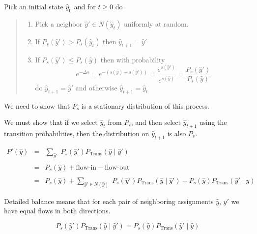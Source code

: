 {

Pick an initial state $\hat{y}_0$ and for $t \geq 0$ do
\vspace{-2ex}
\begin{quotation}

    \noindent \begin{enumerate}
    \item Pick a neighbor $\hat{y}' \in N(\hat{y}_t)$ uniformly at random.

    \vfill      
    \item If $P_s(\hat{y}') > P_s(\hat{y}_t)$ then {\color{red} $\hat{y}_{t+1} = \hat{y}'$}

    \vfill      
    \item If $P_s(\hat{y}') \leq P_s(\hat{y})$ then with probability
$$e^{-\Delta s} = e^{-(s(\hat{y}) - s(\hat{y}'))}   = \frac{e^{s(\hat{y}')}}{e^{s(\hat{y})}} = \frac{P_s(\hat{y}')}{P_s(\hat{y})}$$
   do  {\color{red} $\hat{y}_{t+1} = \hat{y}'$} and otherwise {\color{red} $\hat{y}_{t+1} = \hat{y}_t$} 
  \end{enumerate}  
\end{quotation}

We need to show that $P_s$ is a stationary distribution of this process.

\vfill
We must show that if we select $\hat{y}_t$ from $P_s$, and then select $\hat{y}_{t+1}$ using the transition probabilities,
then the distribution on $\hat{y}_{t+1}$ is also $P_s$.


\begin{eqnarray*}
P'(\hat{y}) & = & \sum_{\hat{y}'}\;P_s(\hat{y}')P_{\mathrm{Trans}}(\hat{y}\;|\;\hat{y}') \\
\\
& = & P_s(\hat{y}) + \mbox{flow-in} - \mbox{flow-out} \\
\\
& = & P_s(\hat{y}) + \sum_{\hat{y}' \in N(\hat{y})}\;P_s(\hat{y}'){P_{\mathrm{Trans}}(\hat{y}\;|\;\hat{y}')}
- P_s(\hat{y}){P_{\mathrm{Trans}}(\hat{y}'\;|\;\hat{y})}
\end{eqnarray*}



Detailed balance means that for each pair of neighboring assignments $\hat{y}$, $\hat{y}'$ we have equal flows in both directions.

\vfill
$$P_s(\hat{y}')P_{\mathrm{Trans}}(\hat{y}\;|\;\hat{y}') = P_s(\hat{y})P_{\mathrm{Trans}}(\hat{y}'\;|\;\hat{y})$$

}
